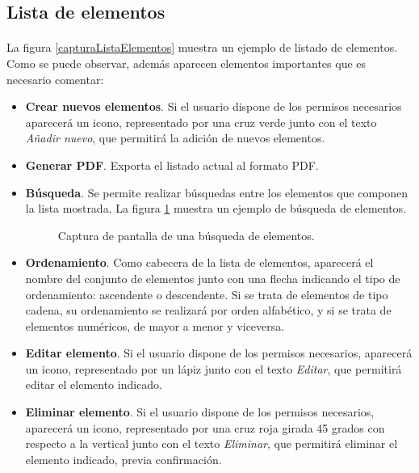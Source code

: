 \subsection{Lista de elementos}

  \paragraph{}La figura \ref{capturaListaElementos} muestra un ejemplo de
  listado de elementos. Como se puede observar, además aparecen elementos
  importantes que es necesario comentar:

  \begin{itemize}
   \item \textbf{Crear nuevos elementos}. Si el usuario dispone de los permisos
   necesarios aparecerá un icono, representado por una cruz verde junto con el
   texto \textit{Añadir nuevo}, que permitirá la adición de nuevos elementos.
   \item \textbf{Generar PDF}. Exporta el listado actual al formato PDF.
   \item \textbf{Búsqueda}. Se permite realizar búsquedas entre los elementos
   que componen la lista mostrada. La figura \ref{capturaBusquedaElementos}
   muestra un ejemplo de búsqueda de elementos.
   \begin{figure}[!ht]
    \begin{center}
      \caption{Captura de pantalla de una búsqueda de elementos.}
      \label{capturaBusquedaElementos}
    \end{center}
  \end{figure}
   \item \textbf{Ordenamiento}. Como cabecera de la lista de elementos,
   aparecerá el nombre del conjunto de elementos junto con una flecha indicando
   el tipo de ordenamiento: ascendente o descendente. Si se trata de elementos
   de tipo cadena, su ordenamiento se realizará por orden alfabético, y si se
   trata de elementos numéricos, de mayor a menor y viceversa.
   \item \textbf{Editar elemento}. Si el usuario dispone de los permisos
   necesarios, aparecerá un icono, representado por un lápiz junto con el texto
   \textit{Editar}, que permitirá editar el elemento indicado.
   \item \textbf{Eliminar elemento}. Si el usuario dispone de los permisos
   necesarios, aparecerá un icono, representado por una cruz roja girada 45
   grados con respecto a la vertical junto con el texto \textit{Eliminar}, que
   permitirá eliminar el elemento indicado, previa confirmación.
  \end{itemize}

